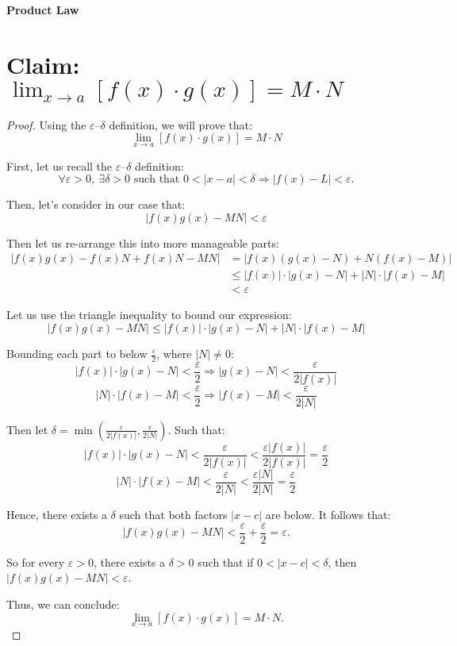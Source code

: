 \documentclass{article}
\begin{document}
	
\textbf{Product Law}

\section*{Claim: $\lim_{x \to a} [f(x) \cdot g(x)] = M \cdot N$
}


\begin{proof}


Using the $\varepsilon$–$\delta$ definition, we will prove that:
\[
\lim_{x \to a} [f(x) \cdot g(x)] = M \cdot N
\]


First, let us recall the $\varepsilon$–$\delta$ definition:
\[
\forall \varepsilon > 0, \ \exists \delta > 0 \text{ such that } 0 < |x - a| < \delta \Rightarrow \left|f(x) - L\right| < \varepsilon.
\]   


Then, let's consider in our case that:
\[
\left| f(x)g(x) - MN \right| < \varepsilon
\]

Then let us re-arrange this into more manageable parts:
\[
\begin{aligned}
\left| f(x)g(x) - f(x)N + f(x)N - MN \right| 
&= \left| f(x)(g(x) - N) + N(f(x) - M) \right| \\
&\leq \left| f(x) \right| \cdot \left| g(x) - N \right| + \left| N \right| \cdot \left| f(x) - M \right| \\
&< \varepsilon
\end{aligned}
\]


Let us use the triangle inequality to bound our expression:
\[
\left| f(x)g(x) - MN \right| \leq \left| f(x) \right| \cdot \left| g(x) - N \right| + \left| N \right| \cdot \left| f(x) - M \right|
\]


Bounding each part to below $\frac{\varepsilon}{2}$, where $|N| \neq 0$: 
\[
|f(x)| \cdot |g(x) - N| < \frac{\varepsilon}{2} \Rightarrow |g(x) - N| < \frac{\varepsilon}{2 |f(x)|}
\]
\[
|N| \cdot |f(x) - M| < \frac{\varepsilon}{2} \Rightarrow |f(x) - M| < \frac{\varepsilon}{2 |N|}
\]


Then let $\delta = \min\left(\frac{\varepsilon}{2|f(x)|}, \frac{\varepsilon}{2|N|}\right)$. Such that:
\[
|f(x)| \cdot |g(x) - N| < \frac{\varepsilon}{2|f(x)|} < \frac{\varepsilon |f(x)|}{2 |f(x)|} = \frac{\varepsilon}{2}
\]
\[
|N| \cdot |f(x) - M| < \frac{\varepsilon}{2|N|} < \frac{\varepsilon |N|}{2 |N|} = \frac{\varepsilon}{2}
\]


Hence, there exists a $\delta$ such that both factors $|x - c|$ are below. It follows that:
\[
| f(x)g(x) - MN | < \frac{\varepsilon}{2} + \frac{\varepsilon}{2} = \varepsilon.
\]


So for every $\varepsilon > 0$, there exists a $\delta > 0$ such that if $0 < |x - c| < \delta$, then $|f(x)g(x) - MN| < \varepsilon$.


Thus, we can conclude:
\[
\lim_{x \to a} [f(x) \cdot g(x)] = M \cdot N.
\]

\end{proof}
\end{document}
